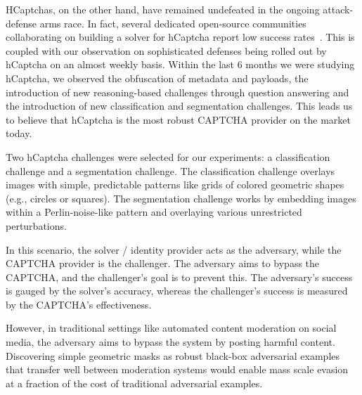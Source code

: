 \documentclass[a4paper, oneside]{discothesis}
\begin{document}
HCaptchas, on the other hand, have remained undefeated in the ongoing attack-defense arms race. In fact, several dedicated open-source communities collaborating on building a solver for hCaptcha report low success rates~\cite{hcaptcha2024base64, hcaptcha_challenger}. This is coupled with our observation on sophisticated defenses being rolled out by hCaptcha on an almost weekly basis. Within the last 6 months we were studying hCaptcha, we observed the obfuscation of metadata and payloads, the introduction of new reasoning-based challenges through question answering and the introduction of new classification and segmentation challenges. This leads us to believe that hCaptcha is the most robust CAPTCHA provider on the market today.

Two hCaptcha challenges were selected for our experiments: a classification challenge and a segmentation challenge. The classification challenge overlays images with simple, predictable patterns like grids of colored geometric shapes (e.g., circles or squares). The segmentation challenge works by embedding images within a Perlin-noise-like pattern and overlaying various unrestricted perturbations.

In this scenario, the solver / identity provider acts as the adversary, while the CAPTCHA provider is the challenger. The adversary aims to bypass the CAPTCHA, and the challenger's goal is to prevent this. The adversary's success is gauged by the solver's accuracy, whereas the challenger's success is measured by the CAPTCHA's effectiveness. 

However, in traditional settings like automated content moderation on social media, the adversary aims to bypass the system by posting harmful content. Discovering simple geometric masks as robust black-box adversarial examples that transfer well between moderation systems would enable mass scale evasion at a fraction of the cost of traditional adversarial examples.
\end{document}
